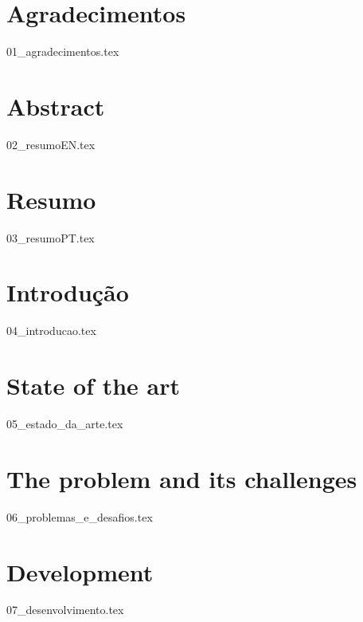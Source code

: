 \documentclass[
  oneside,
  11pt, a4paper,
  footinclude=true,
  headinclude=true,
  cleardoublepage=empty
]{scrbook}
\author{José Carlos Lima Martins}
\date{\myear} %
\begin{document}
    \umfrontcover{}
    \umtitlepage{}
	
	\chapter*{Agradecimentos}
    {01_agradecimentos.tex}

	\chapter*{Abstract}
    {02_resumoEN.tex}
	
    \cleardoublepage{}
	\chapter*{Resumo}
    {03_resumoPT.tex}
	
	\tableofcontents
	\listoffigures
	\listoftables
	
	
	\chapter{Introdução}
    {04_introducao.tex}

	\chapter{State of the art}
    {05_estado_da_arte.tex}

	\chapter{The problem and its challenges}
    {06_problemas_e_desafios.tex}

	\chapter{Development}
    {07_desenvolvimento.tex}
		
\end{document}
